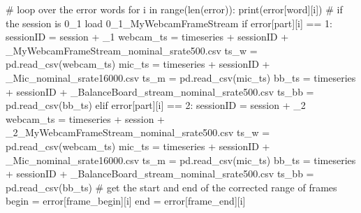 \documentclass[
  letterpaper,
  DIV=11,
  numbers=noendperiod]{scrreprt}
\newenvironment{Shaded}{\begin{snugshade}}{\end{snugshade}}
\newcommand{\BuiltInTok}[1]{\textcolor[rgb]{0.00,0.23,0.31}{#1}}
\newcommand{\CommentTok}[1]{\textcolor[rgb]{0.37,0.37,0.37}{#1}}
\newcommand{\ControlFlowTok}[1]{\textcolor[rgb]{0.00,0.23,0.31}{#1}}
\newcommand{\DecValTok}[1]{\textcolor[rgb]{0.68,0.00,0.00}{#1}}
\newcommand{\KeywordTok}[1]{\textcolor[rgb]{0.00,0.23,0.31}{#1}}
\newcommand{\NormalTok}[1]{\textcolor[rgb]{0.00,0.23,0.31}{#1}}
\newcommand{\OperatorTok}[1]{\textcolor[rgb]{0.37,0.37,0.37}{#1}}
\newcommand{\StringTok}[1]{\textcolor[rgb]{0.13,0.47,0.30}{#1}}
\begin{document}
\begin{Shaded}
\begin{Highlighting}[]
    \CommentTok{\# loop over the error words}
    \ControlFlowTok{for}\NormalTok{ i }\KeywordTok{in} \BuiltInTok{range}\NormalTok{(}\BuiltInTok{len}\NormalTok{(error)):}
        \BuiltInTok{print}\NormalTok{(error[}\StringTok{\textquotesingle{}word\textquotesingle{}}\NormalTok{][i])}
        \CommentTok{\# if the session is 0\_1 load 0\_1\_MyWebcamFrameStream}
        \ControlFlowTok{if}\NormalTok{ error[}\StringTok{\textquotesingle{}part\textquotesingle{}}\NormalTok{][i] }\OperatorTok{==} \DecValTok{1}\NormalTok{:}
\NormalTok{            sessionID }\OperatorTok{=}\NormalTok{ session }\OperatorTok{+} \StringTok{\textquotesingle{}\_1\textquotesingle{}}
\NormalTok{            webcam\_ts }\OperatorTok{=}\NormalTok{ timeseries }\OperatorTok{+}\NormalTok{ sessionID }\OperatorTok{+} \StringTok{\textquotesingle{}\_MyWebcamFrameStream\_nominal\_srate500.csv\textquotesingle{}}
\NormalTok{            ts\_w }\OperatorTok{=}\NormalTok{ pd.read\_csv(webcam\_ts)}
\NormalTok{            mic\_ts }\OperatorTok{=}\NormalTok{ timeseries }\OperatorTok{+}\NormalTok{ sessionID }\OperatorTok{+} \StringTok{\textquotesingle{}\_Mic\_nominal\_srate16000.csv\textquotesingle{}}
\NormalTok{            ts\_m }\OperatorTok{=}\NormalTok{ pd.read\_csv(mic\_ts)}
\NormalTok{            bb\_ts }\OperatorTok{=}\NormalTok{ timeseries }\OperatorTok{+}\NormalTok{ sessionID }\OperatorTok{+} \StringTok{\textquotesingle{}\_BalanceBoard\_stream\_nominal\_srate500.csv\textquotesingle{}}
\NormalTok{            ts\_bb }\OperatorTok{=}\NormalTok{ pd.read\_csv(bb\_ts)}
        \ControlFlowTok{elif}\NormalTok{ error[}\StringTok{\textquotesingle{}part\textquotesingle{}}\NormalTok{][i] }\OperatorTok{==} \DecValTok{2}\NormalTok{:}
\NormalTok{            sessionID }\OperatorTok{=}\NormalTok{ session }\OperatorTok{+} \StringTok{\textquotesingle{}\_2\textquotesingle{}}
\NormalTok{            webcam\_ts }\OperatorTok{=}\NormalTok{ timeseries }\OperatorTok{+}\NormalTok{ session }\OperatorTok{+} \StringTok{\textquotesingle{}\_2\_MyWebcamFrameStream\_nominal\_srate500.csv\textquotesingle{}}
\NormalTok{            ts\_w }\OperatorTok{=}\NormalTok{ pd.read\_csv(webcam\_ts)}
\NormalTok{            mic\_ts }\OperatorTok{=}\NormalTok{ timeseries }\OperatorTok{+}\NormalTok{ sessionID }\OperatorTok{+} \StringTok{\textquotesingle{}\_Mic\_nominal\_srate16000.csv\textquotesingle{}}
\NormalTok{            ts\_m }\OperatorTok{=}\NormalTok{ pd.read\_csv(mic\_ts)}
\NormalTok{            bb\_ts }\OperatorTok{=}\NormalTok{ timeseries }\OperatorTok{+}\NormalTok{ sessionID }\OperatorTok{+} \StringTok{\textquotesingle{}\_BalanceBoard\_stream\_nominal\_srate500.csv\textquotesingle{}}
\NormalTok{            ts\_bb }\OperatorTok{=}\NormalTok{ pd.read\_csv(bb\_ts)}
            \CommentTok{\# get the start and end of the corrected range of frames}
\NormalTok{            begin }\OperatorTok{=}\NormalTok{ error[}\StringTok{\textquotesingle{}frame\_begin\textquotesingle{}}\NormalTok{][i]}
\NormalTok{            end }\OperatorTok{=}\NormalTok{ error[}\StringTok{\textquotesingle{}frame\_end\textquotesingle{}}\NormalTok{][i]}


\end{Highlighting}
\end{Shaded}
\end{document}
